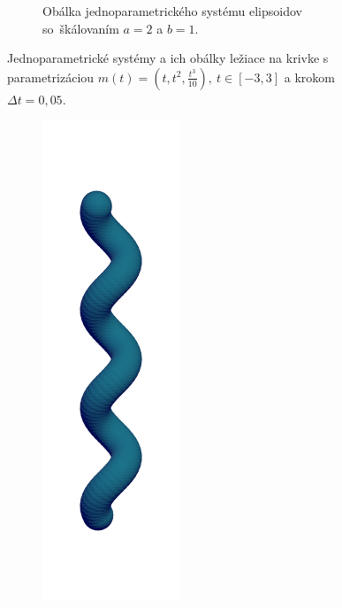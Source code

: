 \documentclass[12pt, twoside]{book}
\begin{document}
\begin{figure}[h]
\begin{subfigure}[t]{0.49\textwidth}
        	\caption{Obálka jednoparametrického systému elipsoidov so~škálovaním $a=2$ a $b=1$.}
        \label{fig:plocha6}
    \end{subfigure}
    	\caption[Jednoparametrické systémy a ich obálky ležiace na krivke Bienert.]{Jednoparametrické systémy a ich obálky ležiace na krivke s parametrizáciou  $m(t)=(t, t^2, \frac{t^3}{10}), \  t \in [-3, 3]$ a krokom $\Delta t = 0,05$.}
    \label{fig:katalogI}
\end{figure}
\begin{figure}[t!]
	\captionsetup{justification=centering}
	\captionsetup[subfigure]{justification=centering}
    \begin{subfigure}[t]{0.32\textwidth}
        \centering
        \includegraphics[width=0.45\textwidth, trim=0mm 80mm 0mm 80mm, clip=true]{images/helix_spheres.png}

\end{subfigure}
\end{figure}
\end{document}
